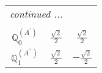 \documentclass[fleqn,10pt,landscape]{article}
\begin{document}
\begin{itemize}
{\begin{center}
\begin{longtable}{ccc}
 \hline \hline
\multicolumn{2}{r}{\footnotesize\it continued ...} \\ \endfoot

 \hline \hline
\multicolumn{2}{r}{} \\ \endlastfoot

$\mathbb{Q}_{0}^{(A^{\prime})}$ & $ \frac{\sqrt{2}}{2} $ & $ \frac{\sqrt{2}}{2} $ \\ \hline
$\mathbb{Q}_{1}^{(A^{\prime\prime})}$ & $ \frac{\sqrt{2}}{2} $ & $ - \frac{\sqrt{2}}{2} $ \\
\end{longtable}
\end{center}
}
\end{itemize}
\end{document}
